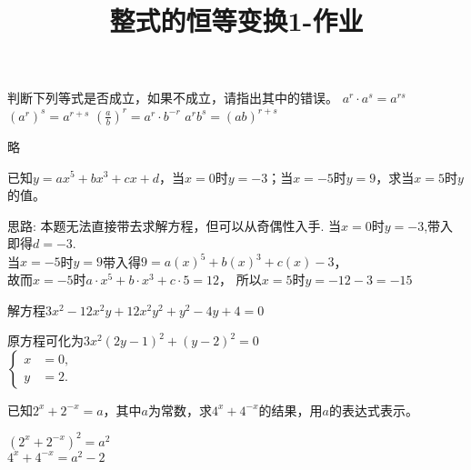 \documentclass[windows,csize4,answers]{BHCexam}
\title{整式的恒等变换1-作业}
\begin{document}
\maketitle


\begin{groups}

    \begin{questions}[]
        \question[5] 判断下列等式是否成立，如果不成立，请指出其中的错误。
        \fourchoices
        {$a^r\cdot a^s=a^{rs}$}
        {$(a^r)^s=a^{r+s}$}
        {$\left(\frac{a}{b}\right)^r=a^r\cdot b^{-r}$}
        {$a^r b^s=\left(ab\right)^{r+s}$ }
        \begin{solution}{0.5cm}
            \methodonly 略
        \end{solution}
        \vspace{3.5cm}

        \question[5] 已知$y=ax^5+bx^3+cx+d$，当$x=0$时$y=-3$；当$x=-5$时$y=9$，求当$x=5$时$y$的值。
        \begin{solution}{0.5cm}
            \methodonly 思路: 本题无法直接带去求解方程，但可以从奇偶性入手.
            当$x=0$时$y=-3$,带入即得$d=-3$. \\
            当$x=-5$时$y=9$带入得$9=a(x)^5+b(x)^3+c(x)-3$，\\
            故而$x=-5$时$a\cdot x^5+ b\cdot x^3 + c\cdot 5 = 12$， 所以$x=5$时$y=-12-3=-15$
        \end{solution}
        \vspace{3.5cm}

        \question[5] 解方程$3x^2-12x^2y+12x^2y^2+y^2-4y+4=0$
        \begin{solution}{0.5cm}
            \methodonly 原方程可化为$3x^2(2y-1)^2+(y-2)^2=0$ \\
                $\left\{ 
                \begin{aligned}
                    x&=0,\\
                    y&=2.
                \end{aligned}
                \right. $
        \end{solution}
        \vspace{3.5cm}

        \question[5] 已知$2^x+2^{-x}=a$，其中$a$为常数，求$4^x+4^{-x}$的结果，用$a$的表达式表示。
        \begin{solution}{0.5cm}
            \methodonly $(2^x+2^{-x})^2=a^2$
            \\$4^x+4^{-x}=a^2-2$
        \end{solution}
        \vspace{3.5cm}


\end{questions}
\end{groups}
\end{document}
